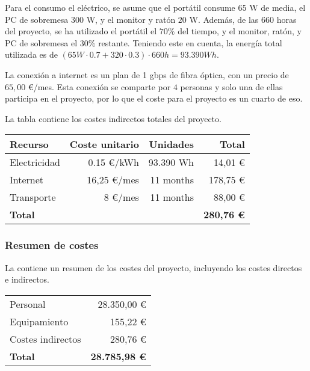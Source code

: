 Para el consumo el eléctrico, se asume que el portátil consume $65$ W de media,
el PC de sobremesa $300$ W, y el monitor y ratón $20$ W. Además, de las $660$
horas del proyecto, se ha utilizado el portátil el $70 \%$ del tiempo, y el
monitor, ratón, y PC de sobremesa el $30 \%$ restante. Teniendo este en cuenta,
la energía total utilizada es de $(65 W \cdot 0.7 + 320 \cdot 0.3) \cdot 660 h =
93.390 Wh$.

La conexión a internet es un plan de 1 gbps de fibra óptica, con un precio
de $65,00$ \euro/mes. Esta conexión se comparte por $4$ personas y solo una de
ellas participa en el proyecto, por lo que el coste para el proyecto es un
cuarto de eso.

\noindent
La tabla  contiene los costes indirectos totales del
proyecto.

\begin{table}[htb]
    {
      \begin{tabular}{lrrr}
        \toprule
        \textbf{Recurso} & \textbf{Coste unitario} & \textbf{Unidades} & \textbf{Total} \\
        \midrule
        Electricidad &   0.15 \euro/kWh & 93.390 Wh &  14,01 \euro \\
        Internet     &  16,25 \euro/mes & 11 months & 178,75 \euro \\
        Transporte   &      8 \euro/mes & 11 months &  88,00 \euro \\
        \midrule
        \textbf{Total} & & & \textbf{280,76 \euro} \\
        \bottomrule
      \end{tabular}
    }
\end{table}

\subsubsection{Resumen de costes}\label{subsubsec:costs-summary}

\noindent
La  contiene un resumen de los costes del proyecto,
incluyendo los costes directos e indirectos.

\begin{table}[htb]
    {
      \begin{tabular}{lr}
        \toprule
        Personal          & 28.350,00 \euro \\
        Equipamiento      &    155,22 \euro \\
        Costes indirectos &    280,76 \euro \\
        \midrule
        \textbf{Total}    & \textbf{28.785,98 \euro} \\
        \bottomrule
      \end{tabular}
    }
\end{table}

